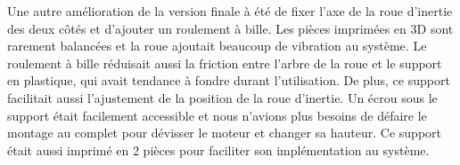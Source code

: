 \newpage

Une autre amélioration de la version finale à été de fixer l’axe de la roue d’inertie des deux côtés et d’ajouter un roulement à bille.
Les pièces imprimées en 3D sont rarement balancées et la roue ajoutait beaucoup de vibration au système.
Le roulement à bille réduisait aussi la friction entre l’arbre de la roue et le support en plastique, qui avait tendance à fondre durant l’utilisation.
De plus, ce support facilitait aussi l’ajustement de la position de la roue d’inertie.
Un écrou sous le support était facilement accessible et nous n’avions plus besoins de défaire le montage au complet pour dévisser le moteur et changer sa hauteur.
Ce support était aussi imprimé en 2 pièces pour faciliter son implémentation au système.

\begin{figure}[h!]
    \centering
    

\end{figure}
